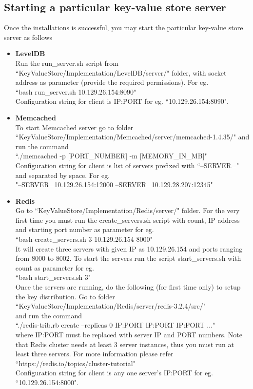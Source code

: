 \documentclass[11pt]{article}
\begin{document}
\subsection{Starting a particular key-value store server}
Once the installations is successful, you may start the particular key-value store server as follows
\begin{itemize}
\item \textbf{LevelDB}\\
Run the run\_server.sh script from  ``KeyValueStore/Implementation/LevelDB/server/" folder, with socket address as parameter (provide the required permissions). For eg.\\
``bash run\_server.sh 10.129.26.154:8090"\\
Configuration string for client is IP:PORT for eg. ``10.129.26.154:8090".

\item \textbf{Memcached}\\
To start Memcached server go to folder\\
``KeyValueStore/Implementation/Memcached/server/memcached-1.4.35/" and run the command \\
``./memcached -p [PORT\_NUMBER] -m [MEMORY\_IN\_MB]"\\
Configuration string for client is list of servers prefixed with ``--SERVER=" and separated by space. For eg.\\
"--SERVER=10.129.26.154:12000 --SERVER=10.129.28.207:12345"

\item \textbf{Redis}\\
Go to ``KeyValueStore/Implementation/Redis/server/" folder.
For the very first time you must run the create\_servers.sh script with count, IP address and starting port number as parameter for eg.\\
``bash create\_servers.sh 3 10.129.26.154 8000"\\
It will create three servers with given IP as 10.129.26.154 and ports ranging from 8000 to 8002. To start the servers run the script start\_servers.sh with count as parameter for eg.\\
``bash start\_servers.sh 3"\\
Once the servers are running, do the following (for first time only) to setup the key distribution. Go to folder\\
``KeyValueStore/Implementation/Redis/server/redis-3.2.4/src/"\\
and run the command\\
``./redis-trib.rb create --replicas 0 IP:PORT IP:PORT IP:PORT ..."\\
where IP:PORT must be replaced with server IP and PORT numbers.
Note that Redis cluster needs at least 3 server instances, thus you must run at least three servers.
For more information please refer \\
``https://redis.io/topics/cluster-tutorial"\\
Configuration string for client is any one server's IP:PORT for eg.\\ ``10.129.26.154:8000".
\end{itemize}
\end{document}
